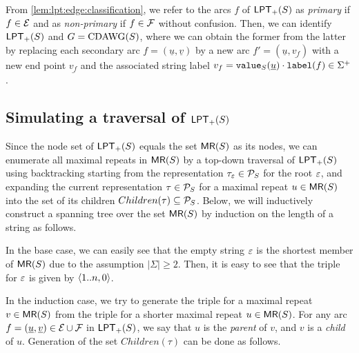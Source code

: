 \documentclass{article}
\begin{document}

From \cref{lem:lpt:edge:classification}, we refer to the arcs $f$ of $\mathsf{LPT}_{+}(S)$ as \textit{primary} if $f \in \mathcal{E}$ and as \textit{non-primary} if $f \in \mathcal{F}$ without confusion. Then, we can identify $\mathsf{LPT}_{+}(S)$ and $G = \mathrm{CDAWG}(S)$, where we can obtain the former from the latter by replacing each secondary arc $f = (\underline u, \underline v)$ by a new arc $f' = (\underline u, \underline {v_f})$ with a new end point $\underline{v_f}$ and the associated string label $v_f = \mathtt{value}_{S}(\underline u)\cdot \mathtt{label}(f) \in \Sigma^+$. 

\subsection{Simulating a traversal of $\mathsf{LPT}_{+}(S)$}
Since the node set of $\mathsf{LPT}_{+}(S)$ equals the set $\textsf{MR}(S)$ as its nodes, we can enumerate all maximal repeats in $\textsf{MR}(S)$ by a top-down traversal of $\mathsf{LPT}_{+}(S)$ using backtracking starting from the representation $\tau_\varepsilon \in \mathcal{P}_{S}$ for the root $\varepsilon$, and expanding the current representation $\tau \in \mathcal{P}_{S}$ for a maximal repeat $u \in \textsf{MR}(S)$ into the set of its children $Children(\tau) \subseteq \mathcal{P}_{S}$.
Below, we will inductively construct a spanning tree over the set $\textsf{MR}(S)$ by induction on the length of a string as follows.

In the base case, we can easily see that the empty string $\varepsilon$ is the shortest member of $\textsf{MR}(S)$ due to the assumption $|\Sigma|\ge 2$. Then, it is easy to see that the triple for $\varepsilon$ is given by $\langle 1..n, 0\rangle$. 

In the induction case, we try to generate the triple for a maximal repeat $v\in \textsf{MR}(S)$ from the triple for a shorter maximal repeat $u\in \textsf{MR}(S)$.
For any arc $f = (\underline u, \underline v) \in \mathcal{E}_{}\cup\mathcal{F}_{}$ in $\mathsf{LPT}_{+}(S)$, we say that $u$ is the \textit{parent} of $v$, and $v$ is a \textit{child} of $u$. 
Generation of the set $Children(\tau)$ can be done as follows.

\end{document}
